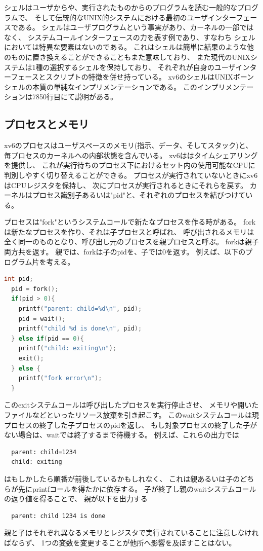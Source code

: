 \documentclass[11pt,a4paper, uplatex]{jsarticle}
\begin{document}
シェルはユーザからや、実行されたものからのプログラムを読む一般的なプログラムで、
そして伝統的なUNIX的システムにおける最初のユーザインターフェースである。
シェルはユーザプログラムという事実があり、カーネルの一部ではなく、
システムコールインターフェースの力を表す例であり、すなわち
シェルにおいては特異な要素はないのである。
これはシェルは簡単に結果のような他のものに置き換えることができることもまた意味しており、
また現代のUNIXシステムは1種の選択するシェルを保持しており、
それぞれが自身のユーザインターフェースとスクリプトの特徴を併せ持っている。
xv6のシェルはUNIXボーンシェルの本質の単純なインプリメンテーションである。
このインプリメンテーションは7850行目にて説明がある。

\subsection{プロセスとメモリ}
xv6のプロセスはユーザスペースのメモリ(指示、データ、そしてスタック)と、
毎プロセスのカーネルへの内部状態を含んでいる。
xv6ははタイムシェアリングを提供し、
これが実行待ちのプロセス下におけるセット内の使用可能なCPUに判別しやすく切り替えることができる。
プロセスが実行されていないときにxv6はCPUレジスタを保持し、
次にプロセスが実行されるときにそれらを戻す。
カーネルはプロセス識別子あるいは"pid"と、それぞれのプロセスを結びつけている。

プロセスは"fork"というシステムコールで新たなプロセスを作る時がある。
forkは新たなプロセスを作り、それは子プロセスと呼ばれ、
呼び出されるメモリは全く同一のものとなり、呼び出し元のプロセスを親プロセスと呼ぶ。
forkは親子両方共を返す。
親では、forkは子のpidを、子では0を返す。
例えば、以下のプログラム片を考える。
\begin{lstlisting}[language=c]
  int pid;
  pid = fork();
  if(pid > 0){
    printf("parent: child=%d\n", pid);
    pid = wait();
    printf("child %d is done\n", pid);
  } else if(pid == 0){
    printf("child: exiting\n");
    exit();
  } else {
    printf("fork error\n");
  }
\end{lstlisting}
このexitシステムコールは呼び出したプロセスを実行停止させ、
メモリや開いたファイルなどといったリソース放棄を引き起こす。
このwaitシステムコールは現プロセスの終了した子プロセスのpidを返し、
もし対象プロセスの終了した子がない場合は、waitでは終了するまで待機する。
例えば、これらの出力では
\begin{lstlisting}
  parent: child=1234
  child: exiting
\end{lstlisting}
はもしかしたら順番が前後しているかもしれなく、
これは親あるいは子のどちらが先にprintfコールを得たかに依存する。
子が終了し親のwaitシステムコールの返り値を得ることで、
親が以下を出力する
\begin{lstlisting}
  parent: child 1234 is done
\end{lstlisting}
親と子はそれぞれ異なるメモリとレジスタで実行されていることに注意しなければならず、
1つの変数を変更することが他所へ影響を及ぼすことはない。


%
%
\end{document}
